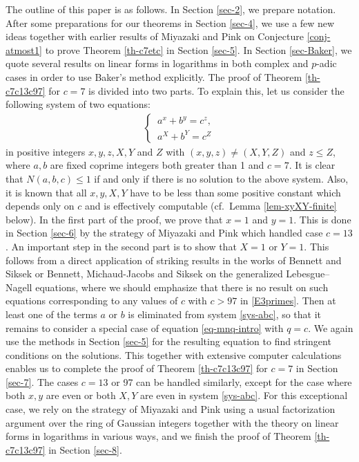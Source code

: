 \documentclass[11pt]{amsart}
\numberwithin{equation}{section}
\begin{document}
The outline of this paper is as follows. 
In Section \ref{sec-2}, we prepare notation.
After some preparations for our theorems in Section \ref{sec-4}, we use a few new ideas together with earlier results of Miyazaki and Pink on Conjecture \ref{conj-atmost1} to prove Theorem \ref{th-c7etc} in Section \ref{sec-5}.
In Section \ref{sec-Baker}, we quote several results on linear forms in logarithms in both complex and $p$-adic cases in order to use Baker's method explicitly. 
The proof of Theorem \ref{th-c7c13c97} for $c=7$ is divided into two parts.
To explain this, let us consider the following system of two equations:
\begin{eqnarray}\label{sys-abc}
\begin{cases}
\,a^x+b^y=c^z,\\
\,a^X+b^Y=c^Z
\end{cases}
\end{eqnarray}
in positive integers $x,y,z,X,Y$ and $Z$ with $(x,y,z) \ne (X,Y,Z)$ and $z \le Z$, where $a,b$ are fixed coprime integers both greater than 1 and $c=7$.
It is clear that $N(a,b,c) \le 1$ if and only if there is no solution to the above system.
Also, it is known that all $x,y,X,Y$ have to be less than some positive constant which depends only on $c$ and is effectively computable (cf.~Lemma \ref{lem-xyXY-finite} below).
In the first part of the proof, we prove that $x=1$ and $y=1$.
This is done in Section \ref{sec-6} by the strategy of Miyazaki and Pink \cite{MP3} which handled case $c=13$.
An important step in the second part is to show that $X=1$ or $Y=1$.
This follows from a direct application of striking results in the works of Bennett and Siksek \cite{BS} or Bennett, Michaud-Jacobs and Siksek \cite{BeMicSi} on the generalized Lebesgue--Nagell equations, where we should emphasize that there is no result on such equations corresponding to any values of $c$ with $c>97$ in \eqref{E3primes}.
Then at least one of the terms $a$ or $b$ is eliminated from system \eqref{sys-abc}, so that it remains to consider a special case of equation \eqref{eq-mnq-intro} with $q=c$.
We again use the methods in Section \ref{sec-5} for the resulting equation to find stringent conditions on the solutions. 
This together with extensive computer calculations enables us to complete the proof of Theorem \ref{th-c7c13c97} for $c=7$ in Section \ref{sec-7}.
The cases $c=13$ or 97 can be handled similarly, except for the case where both $x,y$ are even or both $X,Y$ are even in system \eqref{sys-abc}.
For this exceptional case, we rely on the strategy of Miyazaki and Pink \cite{MP2} using a usual factorization argument over the ring of Gaussian integers together with the theory on linear forms in logarithms in various ways, and we finish the proof of Theorem \ref{th-c7c13c97} in Section \ref{sec-8}.
\end{document}
